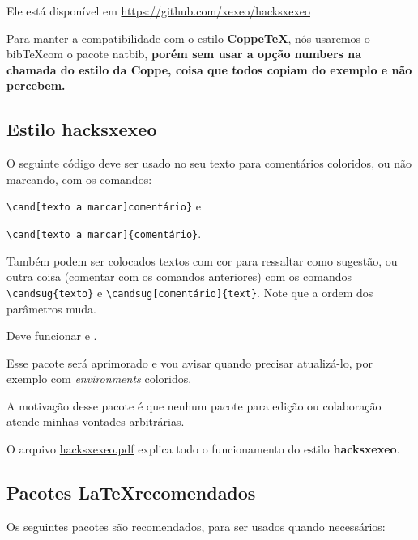 \documentclass{article}
\begin{document}
Ele está  disponível em \url{https://github.com/xexeo/hacksxexeo}

Para manter a compatibilidade com o estilo \textbf{CoppeTeX}, nós usaremos o bib\TeX com o pacote natbib, \textbf{porém sem usar a opção numbers na chamada do estilo da Coppe, coisa que todos copiam do exemplo e não percebem.}


\subsection{Estilo hacksxexeo}

O seguinte código deve ser usado no seu texto para comentários coloridos,  ou não marcando, com os comandos:

\verb!\cand[texto a marcar]comentário}! e 

\verb!\cand[texto a marcar]{comentário}!.

Também podem ser colocados textos com cor para ressaltar como sugestão, ou outra coisa (comentar com os comandos anteriores) com os comandos \verb!\candsug{texto}! e
\verb!\candsug[comentário]{text}!. Note que a ordem dos parâmetros muda.

Deve funcionar  e .

Esse pacote será aprimorado e vou avisar quando precisar atualizá-lo, por exemplo com \textit{environments} coloridos.

A motivação desse pacote é que nenhum pacote para edição ou colaboração atende minhas vontades arbitrárias.

O arquivo \href{https://github.com/xexeo/hacksxexeo/blob/main/dist/hacksxexeo.pdf}{hacksxexeo.pdf} explica todo o funcionamento do estilo \textbf{hacksxexeo}.


\subsection{Pacotes \LaTeX recomendados}
    
    
Os seguintes pacotes são recomendados, para ser usados quando necessários:    
        
\end{document}
